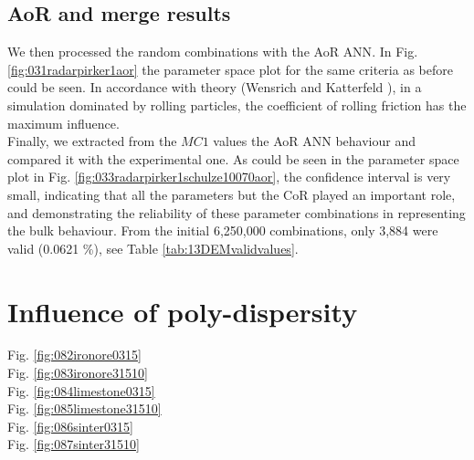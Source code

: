 \subsection{AoR and merge results}
\label{subsec:aorandmergeresults}

We then processed the random combinations with the \acs{AoR} \acs{ANN}. In Fig.
\ref{fig:031radarpirker1aor} the parameter space plot for the same criteria as
before could be seen.
In accordance with theory (Wensrich and Katterfeld \cite{RefWorks:87}), in a simulation dominated
by rolling particles, the coefficient of rolling friction has the maximum
influence. \\
Finally, we extracted from the $MC1$ values the \acs{AoR} \acs{ANN} behaviour
and compared it with the experimental one.
As could be seen in the parameter space plot in Fig.
\ref{fig:033radarpirker1schulze10070aor}, the confidence interval is very small,
indicating that all the parameters but the \acs{CoR} played an important role, 
and demonstrating the reliability of these parameter
combinations in representing the bulk behaviour.
From the initial 6,250,000 combinations, only 3,884 were valid (0.0621
\%), see Table \ref{tab:13DEMvalidvalues}.
% 











\section{Influence of poly-dispersity}
\label{sec:polydispersity}



Fig. \ref{fig:082ironore0315}\\


Fig. \ref{fig:083ironore31510}\\


Fig. \ref{fig:084limestone0315}\\


Fig. \ref{fig:085limestone31510}\\


Fig. \ref{fig:086sinter0315}\\


Fig. \ref{fig:087sinter31510}\\
